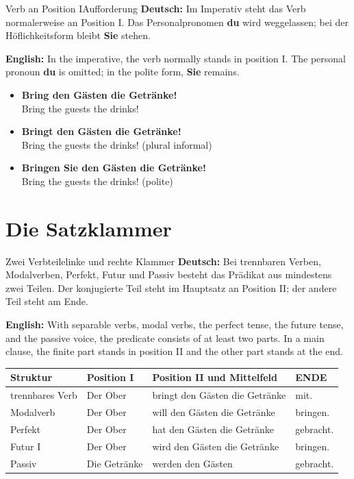 \documentclass[a4paper,11pt]{article}
\newcommand{\GermanText}[1]{\textbf{Deutsch: }#1\par}
\newcommand{\EnglishText}[1]{{\small\color{SoftGray}\textbf{English: }#1\par}}
\newcommand{\ExampleItem}[2]{\item \textbf{#1}\\{\small\color{SoftGray}#2}}
\newcommand{\TableHeader}[1]{\color{white}\textbf{#1}}
\begin{document}
            \begin{grammarentry}{Verb an Position I}{Aufforderung}
                \GermanText{Im Imperativ steht das Verb normalerweise an Position I. Das Personalpronomen \textbf{du} wird weggelassen; bei der Höflichkeitsform bleibt \textbf{Sie} stehen.}
                \EnglishText{In the imperative, the verb normally stands in position I. The personal pronoun \textbf{du} is omitted; in the polite form, \textbf{Sie} remains.}
            \end{grammarentry}
            
            \begin{exbox}
                \begin{itemize}
                    \ExampleItem{Bring den Gästen die Getränke!}{Bring the guests the drinks!}
                    \ExampleItem{Bringt den Gästen die Getränke!}{Bring the guests the drinks! (plural informal)}
                    \ExampleItem{Bringen Sie den Gästen die Getränke!}{Bring the guests the drinks! (polite)}
                \end{itemize}
            \end{exbox}
    
    
    \section{Die Satzklammer}
        
        \begin{grammarentry}{Zwei Verbteile}{linke und rechte Klammer}
            \GermanText{Bei trennbaren Verben, Modalverben, Perfekt, Futur und Passiv besteht das Prädikat aus mindestens zwei Teilen. Der konjugierte Teil steht im Hauptsatz an Position II; der andere Teil steht am Ende.}
            \EnglishText{With separable verbs, modal verbs, the perfect tense, the future tense, and the passive voice, the predicate consists of at least two parts. In a main clause, the finite part stands in position II and the other part stands at the end.}
        \end{grammarentry}
        
        \begin{longtable}{|p{2.8cm}|p{3.0cm}|p{6.2cm}|p{3.0cm}|}
            \hline
            \rowcolor{HeaderBlueDark}
            \TableHeader{Struktur} & \TableHeader{Position I} & \TableHeader{Position II und Mittelfeld} & \TableHeader{ENDE} \\
            \hline
            trennbares Verb & Der Ober & bringt den Gästen die Getränke & mit. \\
            \hline
            Modalverb & Der Ober & will den Gästen die Getränke & bringen. \\
            \hline
            Perfekt & Der Ober & hat den Gästen die Getränke & gebracht. \\
            \hline
            Futur I & Der Ober & wird den Gästen die Getränke & bringen. \\
            \hline
            Passiv & Die Getränke & werden den Gästen & gebracht. \\
            \hline
        \end{longtable}
        
\end{document}
